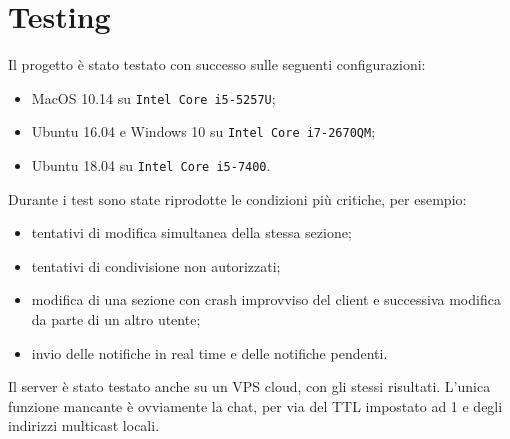 \section{Testing}
Il progetto è stato testato con successo sulle seguenti configurazioni:
\begin{itemize}
	\item MacOS 10.14 su \texttt{Intel Core i5-5257U};
	\item Ubuntu 16.04 e Windows 10 su \texttt{Intel Core i7-2670QM};
	\item Ubuntu 18.04 su \texttt{Intel Core i5-7400}.
\end{itemize}

Durante i test sono state riprodotte le condizioni più critiche, per esempio:
\begin{itemize}
	\item tentativi di modifica simultanea della stessa sezione;
	\item tentativi di condivisione non autorizzati;
	\item modifica di una sezione con crash improvviso del client e successiva modifica da parte di un altro utente;
	\item invio delle notifiche in real time e delle notifiche pendenti.
\end{itemize}

Il server è stato testato anche su un VPS cloud, con gli stessi risultati. L'unica funzione mancante è ovviamente la chat, per via del TTL impostato ad 1 e degli indirizzi multicast locali.
